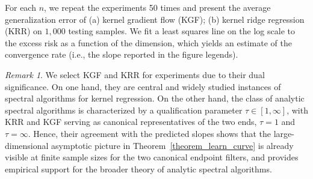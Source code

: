 \documentclass{article}
\theoremstyle{plain}
\theoremstyle{definition}
\theoremstyle{remark}
\newtheorem{remark}[theorem]{Remark}
\newcommand{\dhnote}[1]{{\color{red}[#1]} } %
\begin{document}


For each $n$, we repeat the experiments 50 times and present the average generalization error of (a) kernel gradient flow (KGF); (b) kernel ridge regression (KRR) on $1,000$ testing samples.
We fit a least squares line on the log scale to the excess risk as a function of the dimension, which yields an estimate of the convergence rate (i.e., the slope reported in the figure legends).


\begin{remark}
    We select KGF and KRR for experiments due to their dual significance. 
    On one hand, they are central and widely studied instances of spectral algorithms for kernel regression.
    On the other hand, the class of analytic spectral algorithms is characterized by a qualification parameter $\tau \in [1, \infty]$, with KRR and KGF serving as canonical representatives of the two ends, $\tau=1$ and $\tau =\infty$. 
    Hence, their agreement with the predicted slopes shows that the large-dimensional asymptotic picture in Theorem~\ref{theorem_learn_curve} is already visible at finite sample sizes for the two canonical endpoint filters, and provides empirical support for the broader theory of analytic spectral algorithms.
\end{remark}
\end{document}
